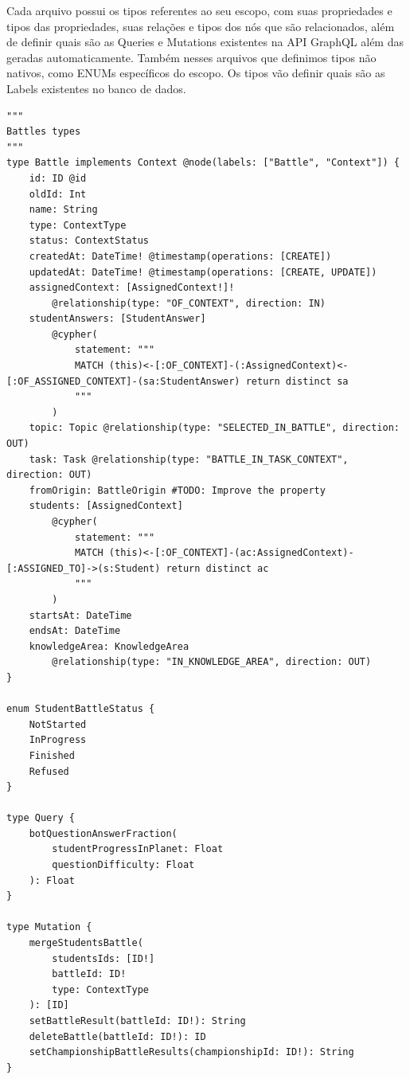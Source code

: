 Cada arquivo possui os tipos referentes ao seu escopo, com suas propriedades e tipos das propriedades, suas relações e tipos dos nós que são relacionados, além de definir quais são as Queries e Mutations existentes na API GraphQL além das geradas automaticamente. Também nesses arquivos que definimos tipos não nativos, como ENUMs específicos do escopo. Os tipos vão definir quais são as Labels existentes no banco de dados.


\begin{lstlisting}
"""
Battles types
"""
type Battle implements Context @node(labels: ["Battle", "Context"]) {
	id: ID @id
	oldId: Int
	name: String
	type: ContextType
	status: ContextStatus
	createdAt: DateTime! @timestamp(operations: [CREATE])
	updatedAt: DateTime! @timestamp(operations: [CREATE, UPDATE])
	assignedContext: [AssignedContext!]!
		@relationship(type: "OF_CONTEXT", direction: IN)
	studentAnswers: [StudentAnswer]
		@cypher(
			statement: """
			MATCH (this)<-[:OF_CONTEXT]-(:AssignedContext)<-[:OF_ASSIGNED_CONTEXT]-(sa:StudentAnswer) return distinct sa
			"""
		)
	topic: Topic @relationship(type: "SELECTED_IN_BATTLE", direction: OUT)
	task: Task @relationship(type: "BATTLE_IN_TASK_CONTEXT", direction: OUT)
	fromOrigin: BattleOrigin #TODO: Improve the property
	students: [AssignedContext]
		@cypher(
			statement: """
			MATCH (this)<-[:OF_CONTEXT]-(ac:AssignedContext)-[:ASSIGNED_TO]->(s:Student) return distinct ac
			"""
		)
	startsAt: DateTime
	endsAt: DateTime
	knowledgeArea: KnowledgeArea
		@relationship(type: "IN_KNOWLEDGE_AREA", direction: OUT)
}

enum StudentBattleStatus {
	NotStarted
	InProgress
	Finished
	Refused
}

type Query {
	botQuestionAnswerFraction(
		studentProgressInPlanet: Float
		questionDifficulty: Float
	): Float
}

type Mutation {
	mergeStudentsBattle(
		studentsIds: [ID!]
		battleId: ID!
		type: ContextType
	): [ID]
	setBattleResult(battleId: ID!): String
	deleteBattle(battleId: ID!): ID
	setChampionshipBattleResults(championshipId: ID!): String
}
\end{lstlisting}


